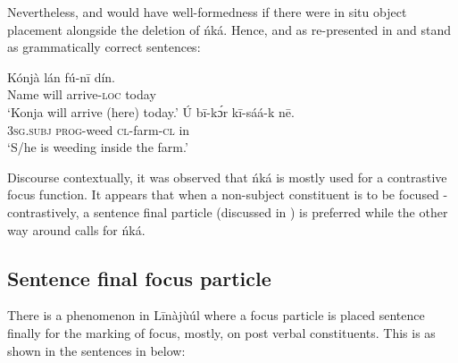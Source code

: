 \documentclass[output=paper,colorlinks,citecolor=brown]{langscibook}
\begin{document}
Nevertheless,  and  would have well-formedness if there were in situ object placement alongside the deletion of ńká. Hence,  and  as re-presented in  and  stand as grammatically correct sentences:

\ea%
    \label{ex:bisilki:16}
    \ea\label{ex:bisilki:16a}
    \gll    Kónjà		lán	fú-nī		dín.\\
            Name		will	arrive\textsc{-loc}	today\\
    \glt    ‘Konja will arrive (here) today.’
    \ex\label{ex:bisilki:16b}
    \gll    Ú		bī-kɔ́r 		kī-sáá-k	nē.\\
            \textsc{3sg.subj}	\textsc{prog-}weed 		\textsc{cl-}farm\textsc{-cl}	in\\
    \glt    ‘S/he is weeding inside the farm.’
    \z
\z

Discourse contextually, it was observed that ńká is mostly used for a contrastive focus function. It appears that when a non-subject constituent is to be focused -contrastively, a sentence final particle (discussed in ) is preferred while the other way around calls for ńká.

\subsection{Sentence final focus particle}\label{sec:bisilki:5.3}

There is a phenomenon in Līnàjùúl where a focus particle is placed sentence finally for the marking of focus, mostly, on post verbal constituents. This is as shown in the sentences in  below:
\end{document}
